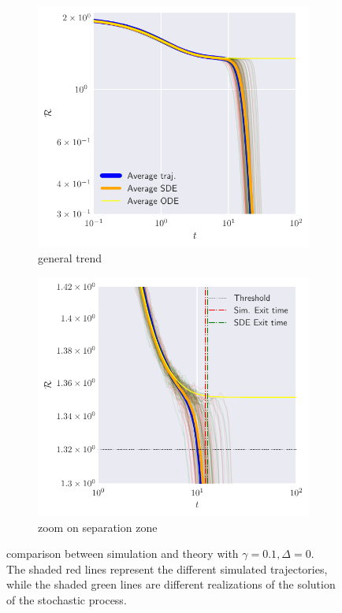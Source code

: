\begin{figure}
  \centering
  \begin{subfigure}{0.75\textwidth}
    \includegraphics[width=1.\textwidth]{figures/sde/unconstrainted-sde-example.pdf}
    \caption{general trend}
  \end{subfigure}
  \begin{subfigure}{0.75\textwidth}
    \includegraphics[width=1.\textwidth]{figures/sde/unconstrainted-sde-example-zoom.pdf}
    \caption{zoom on separation zone}
  \end{subfigure}

  \caption{
    comparison between simulation and theory with \(\gamma=\num{0.1}, \Delta=0\).\\
    The shaded red lines represent the different simulated trajectories,
    while the shaded green lines are different realizations of the solution of the stochastic process.
  }
  \label{fig:unconstrainted-sde}
\end{figure}
